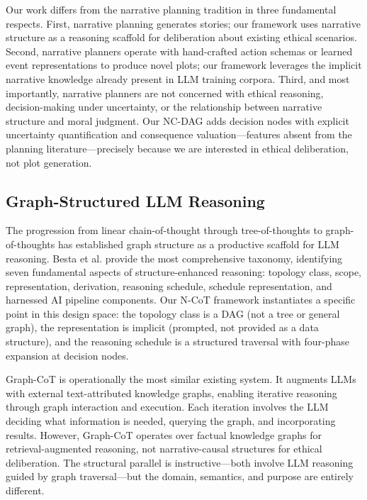 \documentclass[11pt,letterpaper]{article}
\theoremstyle{defn}
\begin{document}
Our work differs from the narrative planning tradition in three fundamental respects. First, narrative planning generates stories; our framework uses narrative structure as a reasoning scaffold for deliberation about existing ethical scenarios. Second, narrative planners operate with hand-crafted action schemas or learned event representations to produce novel plots; our framework leverages the implicit narrative knowledge already present in LLM training corpora. Third, and most importantly, narrative planners are not concerned with ethical reasoning, decision-making under uncertainty, or the relationship between narrative structure and moral judgment. Our NC-DAG adds decision nodes with explicit uncertainty quantification and consequence valuation---features absent from the planning literature---precisely because we are interested in ethical deliberation, not plot generation.

\subsection{Graph-Structured LLM Reasoning}

The progression from linear chain-of-thought \citep{wei2022chain} through tree-of-thoughts \citep{yao2024tree} to graph-of-thoughts \citep{besta2024} has established graph structure as a productive scaffold for LLM reasoning. Besta et al. provide the most comprehensive taxonomy, identifying seven fundamental aspects of structure-enhanced reasoning: topology class, scope, representation, derivation, reasoning schedule, schedule representation, and harnessed AI pipeline components. Our N-CoT framework instantiates a specific point in this design space: the topology class is a DAG (not a tree or general graph), the representation is implicit (prompted, not provided as a data structure), and the reasoning schedule is a structured traversal with four-phase expansion at decision nodes.

Graph-CoT \citep{jin2024graph} is operationally the most similar existing system. It augments LLMs with external text-attributed knowledge graphs, enabling iterative reasoning through graph interaction and execution. Each iteration involves the LLM deciding what information is needed, querying the graph, and incorporating results. However, Graph-CoT operates over factual knowledge graphs for retrieval-augmented reasoning, not narrative-causal structures for ethical deliberation. The structural parallel is instructive---both involve LLM reasoning guided by graph traversal---but the domain, semantics, and purpose are entirely different.
\end{document}
